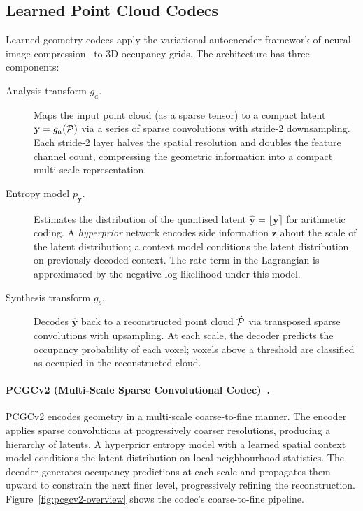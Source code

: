 \subsection{Learned Point Cloud Codecs}
\label{ssec:learned-codecs}

Learned geometry codecs apply the variational autoencoder framework of
neural image compression~\cite{balle2018variational} to 3D occupancy grids.
The architecture has three components:

\begin{description}
  \item[Analysis transform $g_a$.]
    Maps the input point cloud (as a sparse tensor) to a compact latent
    $\mathbf{y} = g_a(\mathcal{P})$ via a series of sparse convolutions with
    stride-2 downsampling.
    Each stride-2 layer halves the spatial resolution and doubles the
    feature channel count, compressing the geometric information into a
    compact multi-scale representation.

  \item[Entropy model $p_{\hat{\mathbf{y}}}$.]
    Estimates the distribution of the quantised latent
    $\hat{\mathbf{y}} = \lfloor \mathbf{y} \rceil$ for arithmetic coding.
    A \emph{hyperprior} network encodes side information $\mathbf{z}$
    about the scale of the latent distribution; a context model conditions
    the latent distribution on previously decoded context.
    The rate term in the Lagrangian is approximated by the negative
    log-likelihood under this model.

  \item[Synthesis transform $g_s$.]
    Decodes $\hat{\mathbf{y}}$ back to a reconstructed point cloud $\hat{\mathcal{P}}$
    via transposed sparse convolutions with upsampling.
    At each scale, the decoder predicts the occupancy probability of each
    voxel; voxels above a threshold are classified as occupied in the
    reconstructed cloud.
\end{description}

\paragraph{PCGCv2 (Multi-Scale Sparse Convolutional Codec)~\cite{wang2021multiscale}.}
PCGCv2 encodes geometry in a multi-scale coarse-to-fine manner.
The encoder applies sparse convolutions at progressively coarser resolutions,
producing a hierarchy of latents.
A hyperprior entropy model with a learned spatial context model conditions
the latent distribution on local neighbourhood statistics.
The decoder generates occupancy predictions at each scale and propagates
them upward to constrain the next finer level, progressively refining
the reconstruction.
Figure~\ref{fig:pcgcv2-overview} shows the codec's coarse-to-fine pipeline.

